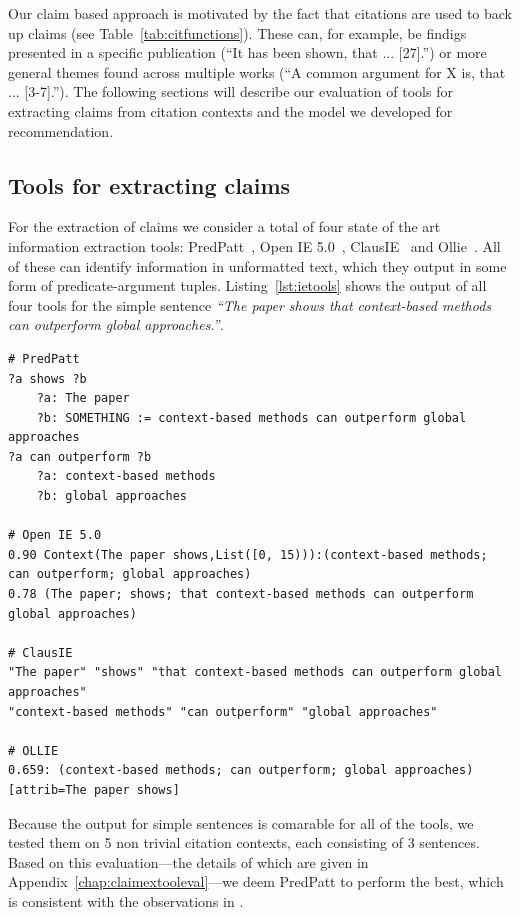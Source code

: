 Our claim based approach is motivated by the fact that citations are used to back up claims (see Table~\ref{tab:citfunctions}). These can, for example, be findigs presented in a specific publication (``It has been shown, that ... [27].'') or more general themes found across multiple works (``A common argument for X is, that ... [3-7].''). The following sections will describe our evaluation of tools for extracting claims from citation contexts and the model we developed for recommendation.

\subsection{Tools for extracting claims}
For the extraction of claims we consider a total of four state of the art \cite{Zhang2017} information extraction tools: PredPatt~\cite{White2016}, Open IE 5.0~\cite{Mausam2016}, ClausIE~\cite{DelCorro2013} and Ollie~\cite{Mausam2012}. All of these can identify information in unformatted text, which they output in some form of predicate-argument tuples. Listing~\ref{lst:ietools} shows the output of all four tools for the simple sentence \emph{``The paper shows that context-based methods can outperform global approaches.''}.

\begin{lstlisting}[caption={Information extraction tool output examples.},label={lst:ietools}]
# PredPatt
?a shows ?b
    ?a: The paper
    ?b: SOMETHING := context-based methods can outperform global approaches
?a can outperform ?b
    ?a: context-based methods
    ?b: global approaches

# Open IE 5.0
0.90 Context(The paper shows,List([0, 15))):(context-based methods; can outperform; global approaches)
0.78 (The paper; shows; that context-based methods can outperform global approaches)

# ClausIE
"The paper" "shows" "that context-based methods can outperform global approaches"
"context-based methods" "can outperform" "global approaches"

# OLLIE
0.659: (context-based methods; can outperform; global approaches)[attrib=The paper shows]
\end{lstlisting}

Because the output for simple sentences is comarable for all of the tools, we tested them on 5 non trivial citation contexts, each consisting of 3 sentences. Based on this evaluation---the details of which are given in Appendix~\ref{chap:claimextooleval}---we deem PredPatt to perform the best, which is consistent with the observations in \cite{Zhang2017}.

